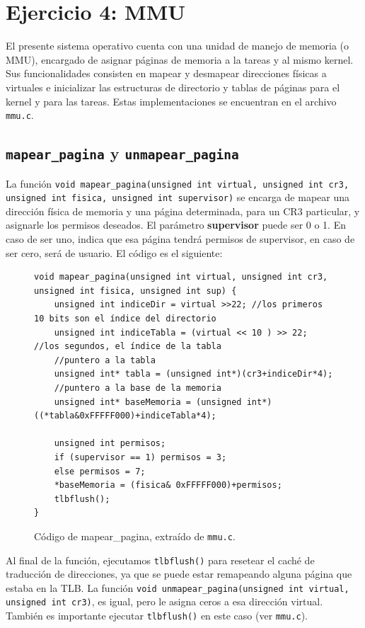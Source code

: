 \documentclass[10pt, a4paper]{article}
\begin{document}
\section{Ejercicio 4: MMU}

El presente sistema operativo cuenta con una unidad de manejo de memoria (o MMU), encargado de asignar páginas de memoria a la tareas y al mismo kernel.
Sus funcionalidades consisten en mapear y desmapear direcciones físicas a virtuales e inicializar las estructuras de directorio y tablas de páginas 
para el kernel y para las tareas.
Estas implementaciones se encuentran en el archivo \texttt{mmu.c}.
\subsection{\texttt{mapear\_pagina} y \texttt{unmapear\_pagina}}
La función \texttt{void mapear\_pagina(unsigned int virtual, unsigned int cr3, unsigned int fisica, unsigned int supervisor)} se encarga de mapear una dirección física
de memoria y una página determinada, para un CR3 particular, y asignarle los permisos deseados. 
El parámetro \textbf{supervisor} puede ser 0 o 1. En caso de ser uno, indica que esa página tendrá permisos de supervisor, en caso de ser cero, será de usuario.
El código es el siguiente:
\begin{figure}[!h]
\begin{center}
\begin{verbatim}
void mapear_pagina(unsigned int virtual, unsigned int cr3, unsigned int fisica, unsigned int sup) {
	unsigned int indiceDir = virtual >>22; //los primeros 10 bits son el índice del directorio
	unsigned int indiceTabla = (virtual << 10 ) >> 22; //los segundos, el índice de la tabla
	//puntero a la tabla
	unsigned int* tabla = (unsigned int*)(cr3+indiceDir*4);
	//puntero a la base de la memoria
	unsigned int* baseMemoria = (unsigned int*)((*tabla&0xFFFFF000)+indiceTabla*4);

	unsigned int permisos;
	if (supervisor == 1) permisos = 3;
	else permisos = 7; 
	*baseMemoria = (fisica& 0xFFFFF000)+permisos; 
	tlbflush();
}
\end{verbatim}
\caption{Código de mapear\_pagina, extraído de \texttt{mmu.c}.}
\end{center}
\end{figure}
\newline
Al final de la función, ejecutamos \texttt{tlbflush()} para resetear el caché de traducción de direcciones, ya que se puede estar remapeando alguna página que estaba en la TLB.
La función \texttt{void unmapear\_pagina(unsigned int virtual, unsigned int cr3)}, es igual, pero le asigna ceros a esa dirección virtual. También es importante ejecutar
\texttt{tlbflush()} en este caso (ver \texttt{mmu.c}).
\end{document}
